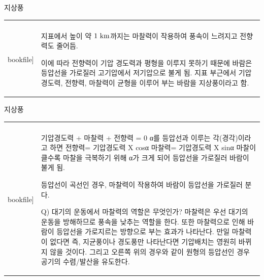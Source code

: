\begin{frame}[t]{지상풍}
	\begin{tabular}{ll}
		\begin{minipage}[t]{0.4\textwidth}\scriptsize
			\begin{figure}[t]
				\texttt{[image: \\bookfile]}
			\end{figure}
			
		\end{minipage}	
		&
		\begin{minipage}[t]{0.55\textwidth} \scriptsize	
			
		지표에서 높이 약 $1\rm{~km}$까지는 마찰력이 작용하여 풍속이 느려지고 전향력도 줄어듬.
		
		이에 따라 전향력이 기압 경도력과 평형을 이루지 못하기 때문에 바람은 등압선을 가로질러 고기압에서 저기압으로 불게 됨.
		지표 부근에서 기압경도력, 전향력, 마찰력이 균형을 이루어 부는 바람을 지상풍이라고 함.
		
			
		\end{minipage}
	\end{tabular}
\end{frame}



\begin{frame}[t]{지상풍}
	\begin{tabular}{ll}
		\begin{minipage}[t]{0.4\textwidth}\scriptsize
			\begin{figure}[t]
				\texttt{[image: \\bookfile]}
			\end{figure}

			
		\end{minipage}	
		&
		\begin{minipage}[t]{0.55\textwidth} \scriptsize	
			
		기압경도력 + 마찰력 + 전향력 = 0
		α를 등압선과 이루는 각(경각)이라고 하면
		전향력= 기압경도력 X cosα
		마찰력= 기압경도력 X sinα
		마찰이 클수록 마찰을 극복하기 위해 α가 크게 되어 등압선을 가로질러 바람이 불게 됨.
		                                                
		등압선이 곡선인 경우, 마찰력이 작용하여 바람이 등압선을 가로질러 분다. 
		
		Q) 대기의 운동에서 마찰력의 역할은 무엇인가?
		마찰력은 우선 대기의 운동을 방해하므로 풍속을 낮추는 역할을 한다. 또한 마찰력으로 인해 바람이 등압선을 가로지르는 방향으로 부는 효과가 나타난다. 만일 마찰력이 없다면 즉, 지균풍이나 경도풍만 나타난다면 기압배치는 영원히 바뀌지 않을 것이다. 그리고 오른쪽 위의 경우와 같이 원형의 등압선인 경우 공기의 수렴/발산을 유도한다.
			
		\end{minipage}
	\end{tabular}
\end{frame}




